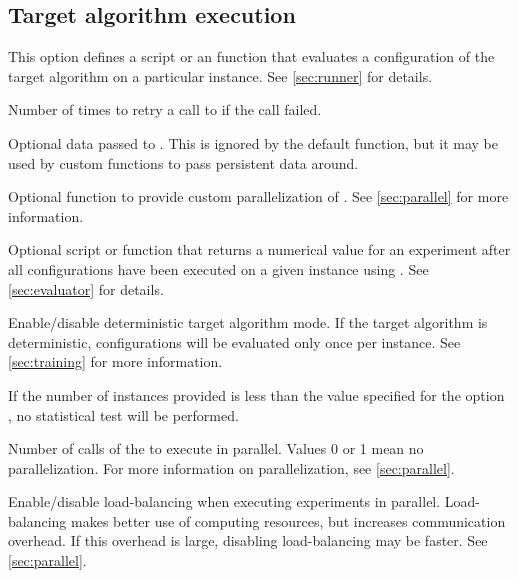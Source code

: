 \subsection[Target algorithm execution]{Target algorithm execution}
\begin{description}
  This option defines a script or an \aR function that evaluates a configuration of the target algorithm on a particular instance. See \autoref{sec:runner} for details.

  Number of times to retry a call to  if the call failed.

Optional data passed to . This is ignored by the default  function, but it may be used by custom  functions to pass persistent data around.

 Optional \aR function to provide custom parallelization of . See \autoref{sec:parallel} for more information.

Optional script or \aR function that returns a numerical value for an experiment after all configurations have been executed on a given instance using . See \autoref{sec:evaluator} for details.

  Enable/disable deterministic target algorithm mode. If the target algorithm is deterministic, configurations will be evaluated only once per instance. See \autoref{sec:training} for more information.
\begin{xwarningbox}
 If the number of instances provided is less than the value specified for the option , no statistical test will be performed.
\end{xwarningbox}

Number of calls of the  to execute in parallel. Values  0 or 1 mean no parallelization. For more information on parallelization, see \autoref{sec:parallel}.

  Enable/disable load-balancing when executing experiments in parallel. Load-balancing makes better use of computing resources, but increases communication overhead. If this overhead is large, disabling load-balancing may be faster. See \autoref{sec:parallel}.


\end{description}
